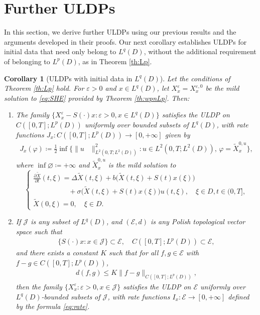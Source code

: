 \documentclass[10pt,a4paper]{amsart}
\newtheorem{corollary}[theorem]{Corollary}
\numberwithin{equation}{section}
\newcommand{\ceqq}{\coloneqq}
\newcommand{\col}{\colon}
\newcommand{\eps}{\varepsilon}
\begin{document}
\section{Further ULDPs}\label{sec:additionalULDPs}

In this section, we derive further ULDPs using our previous results and the arguments developed in their proofs. 
Our next  corollary establishes ULDPs for initial data that need only belong to $L^q(D)$, without the additional requirement of belonging to $L^p(D)$, as in Theorem \ref{th:Lp}.  

\begin{corollary}[ULDPs with initial data in $L^q(D)$]\label{cor:uldp pure Lq}  
Let the conditions of Theorem \ref{th:Lp} hold. For $\eps>0$ and $x\in L^q(D)$, let $X_x^{\eps}=X_x^{\eps,0}$ be the mild solution to \eqref{eq:SHE} provided by Theorem \ref{th:wpnLp}. Then:  
\begin{enumerate}
    \item 
    The family $\{X_x^{\eps}-S(\cdot)x:\eps>0,x\in L^q(D)\}$  satisfies the ULDP on $C([0,T];L^{p}(D))$  uniformly over bounded subsets of $L^q(D)$, with rate functions $J_x\col C([0,T];L^{p}(D))\to [0,+\infty]$ given by 
\begin{align*}
J_x(\varphi)\ceqq \frac12\inf\{\|u&\|_{L^2(0,T;L^2(D))}^2 : u\in L^2(0,T;L^2(D)),\, \varphi=\tilde X_x^{0,u} \}, 
\end{align*}
where $\inf\varnothing\ceqq +\infty$ and $\tilde X_x^{0,u}$ is the mild solution to 
\begin{equation*} 
\begin{cases}
\frac{\partial \tilde X}{\partial t}(t, \xi) = \Delta \tilde X(t, \xi) +b\big(\tilde X(t,\xi)+S(t)x(\xi)\big)\\
\qquad\qquad\quad+ \sigma\big(\tilde X(t, \xi)+S(t)x(\xi)\big)u(t,\xi), \quad  \xi \in D, t \in(0,T], \\ 
\tilde X(0, \xi) = 0, \quad\xi\in D.
\end{cases} 
\end{equation*}  
\item If $\mathcal{J}$ is any subset of $L^q(D)$, and $(\mathcal{E},d)$ is any Polish topological vector space such that 
\begin{align}\label{eq:E inclusionJ}
\{S(\cdot)x:x\in \mathcal{J}\}\subset \mathcal{E}, \quad
C([0,T];L^p(D))\subset \mathcal{E},    
\end{align}
and there exists a constant $K$ such that  for all $f,g\in \mathcal{E}$ with $f-g\in C([0,T];L^p(D))$,   
\begin{align}\label{eq:Lip metricJ}
d(f,g)\leq K\|f-g\|_{C([0,T];L^p(D))},  
\end{align} 
then the family  $\{X_x^{\eps} :\eps>0,x\in \mathcal{J}\}$  satisfies the ULDP on $\mathcal{E}$  uniformly over $L^q(D)$-bounded subsets of $\mathcal{J}$, with rate functions $I_x\col \mathcal{E}\to [0,+\infty]$ defined by the formula \eqref{eq:rate}. 
\end{enumerate}
\end{corollary}
\end{document}
